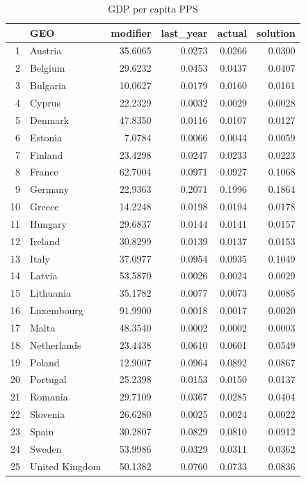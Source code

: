\documentclass[a4paper,twoside,10pt]{article}
\begin{document}
\begin{table}[H]
	\centering
	\begin{tabular}{|r|l|r|r|r|r|}
		\hline
		& GEO & modifier & last\_year & actual & solution \\
		\hline
		1 & Austria & 35.6065 & 0.0273 & 0.0266 & 0.0300 \\
		2 & Belgium & 29.6232 & 0.0453 & 0.0437 & 0.0407 \\
		3 & Bulgaria & 10.0627 & 0.0179 & 0.0160 & 0.0161 \\
		4 & Cyprus & 22.2329 & 0.0032 & 0.0029 & 0.0028 \\
		5 & Denmark & 47.8350 & 0.0116 & 0.0107 & 0.0127 \\
		6 & Estonia & 7.0784 & 0.0066 & 0.0044 & 0.0059 \\\hline
		7 & Finland & 23.4298 & 0.0247 & 0.0233 & 0.0223 \\
		8 & France & 62.7004 & 0.0971 & 0.0927 & 0.1068 \\
		9 & Germany & 22.9363 & 0.2071 & 0.1996 & 0.1864 \\
		10 & Greece & 14.2248 & 0.0198 & 0.0194 & 0.0178 \\
		11 & Hungary & 29.6837 & 0.0144 & 0.0141 & 0.0157 \\\hline
		12 & Ireland & 30.8299 & 0.0139 & 0.0137 & 0.0153 \\
		13 & Italy & 37.0977 & 0.0954 & 0.0935 & 0.1049 \\
		14 & Latvia & 53.5870 & 0.0026 & 0.0024 & 0.0029 \\
		15 & Lithuania & 35.1782 & 0.0077 & 0.0073 & 0.0085 \\
		16 & Luxembourg & 91.9900 & 0.0018 & 0.0017 & 0.0020 \\\hline
		17 & Malta & 48.3540 & 0.0002 & 0.0002 & 0.0003 \\
		18 & Netherlands & 23.4438 & 0.0610 & 0.0601 & 0.0549 \\
		19 & Poland & 12.9007 & 0.0964 & 0.0892 & 0.0867 \\
		20 & Portugal & 25.2398 & 0.0153 & 0.0150 & 0.0137 \\
		21 & Romania & 29.7109 & 0.0367 & 0.0285 & 0.0404 \\\hline
		22 & Slovenia & 26.6280 & 0.0025 & 0.0024 & 0.0022 \\
		23 & Spain & 30.2807 & 0.0829 & 0.0810 & 0.0912 \\
		24 & Sweden & 53.9986 & 0.0329 & 0.0311 & 0.0362 \\
		25 & United Kingdom & 50.1382 & 0.0760 & 0.0733 & 0.0836 \\
		\hline
	\end{tabular}
	\caption{GDP per capita PPS}

\end{table}
\end{document}
